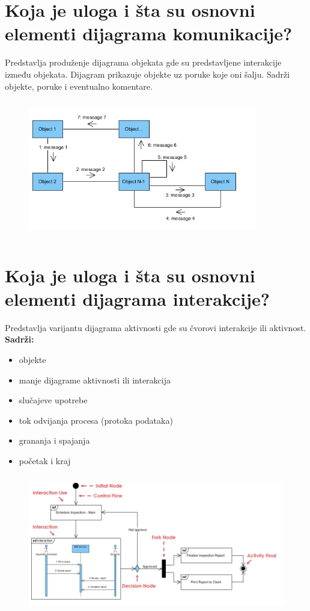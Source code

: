 \documentclass[a4paper]{article}
\begin{document}
\section{Koja je uloga i šta su osnovni elementi dijagrama komunikacije?}
  Predstavlja produženje dijagrama objekata gde su predstavljene interakcije između objekata.
  Dijagram prikazuje objekte uz poruke koje oni šalju. Sadrži objekte, poruke i eventualno komentare.
  \begin{figure}[H]
    \begin{center}
        \includegraphics[width=100mm,height=60mm]{Slike/dijagram_komunikacije.png}
    \end{center}
  \end{figure} 

\section{Koja je uloga i šta su osnovni elementi dijagrama interakcije?}
  Predstavlja varijantu dijagrama aktivnosti gde su čvorovi interakcije ili aktivnost.\\
  \textbf{Sadrži:}
  \begin{itemize}
    \item objekte
    \item manje dijagrame aktivnosti ili interakcija
    \item slučajeve upotrebe
    \item tok odvijanja procesa (protoka podataka)
    \item grananja i spajanja
    \item početak i kraj
  \end{itemize}
  \begin{figure}[H]
    \begin{center}
        \includegraphics[width=120mm,height=60mm]{Slike/dijagram_interakcije.png}
    \end{center}
  \end{figure} 
\end{document}
